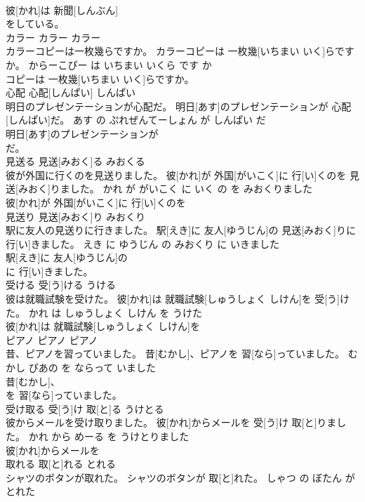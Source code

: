 \documentclass[8pt]{extreport}
\begin{document}
\begin{CJK}{UTF8}{min}
\\	彼[かれ]は 新聞[しんぶん]
\\	をしている。		
\\	カラー	カラー	カラー	
\\	カラーコピーは一枚幾らですか。	カラーコピーは 一枚幾[いちまい いく]らですか。	からーこぴー は いちまい いくら です か	
\\	コピーは 一枚幾[いちまい いく]らですか。		
\\	心配	心配[しんぱい]	しんぱい	
\\	明日のプレゼンテーションが心配だ。	明日[あす]のプレゼンテーションが 心配[しんぱい]だ。	あす の ぷれぜんてーしょん が しんぱい だ	
\\	明日[あす]のプレゼンテーションが
\\	だ。		
\\	見送る	見送[みおく]る	みおくる	
\\	彼が外国に行くのを見送りました。	彼[かれ]が 外国[がいこく]に 行[い]くのを 見送[みおく]りました。	かれ が がいこく に いく の を みおくりました	
\\	彼[かれ]が 外国[がいこく]に 行[い]くのを
\\	見送り	見送[みおく]り	みおくり	
\\	駅に友人の見送りに行きました。	駅[えき]に 友人[ゆうじん]の 見送[みおく]りに 行[い]きました。	えき に ゆうじん の みおくり に いきました	
\\	駅[えき]に 友人[ゆうじん]の
\\	に 行[い]きました。		
\\	受ける	受[う]ける	うける	
\\	彼は就職試験を受けた。	彼[かれ]は 就職試験[しゅうしょく しけん]を 受[う]けた。	かれ は しゅうしょく しけん を うけた	
\\	彼[かれ]は 就職試験[しゅうしょく しけん]を
\\	ピアノ	ピアノ	ピアノ	
\\	昔、ピアノを習っていました。	昔[むかし]、ピアノを 習[なら]っていました。	むかし ぴあの を ならって いました	
\\	昔[むかし]、
\\	を 習[なら]っていました。		
\\	受け取る	受[う]け 取[と]る	うけとる	
\\	彼からメールを受け取りました。	彼[かれ]からメールを 受[う]け 取[と]りました。	かれ から めーる を うけとりました	
\\	彼[かれ]からメールを
\\	取れる	取[と]れる	とれる	
\\	シャツのボタンが取れた。	シャツのボタンが 取[と]れた。	しゃつ の ぼたん が とれた	

\end{CJK}
\end{document}
